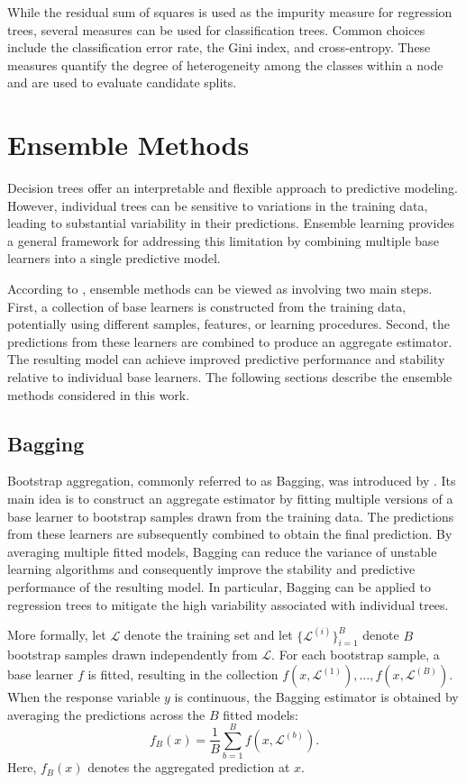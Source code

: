 While the residual sum of squares is used as the impurity measure for
regression trees, several measures can be used for classification trees.
Common choices include the classification error rate, the Gini index, and
cross-entropy. These measures quantify the degree of
heterogeneity among the classes within a node and are used to evaluate
candidate splits.

\section{Ensemble Methods}

Decision trees offer an interpretable and flexible approach to predictive
modeling. However, individual trees can be sensitive to variations in the
training data, leading to substantial variability in their predictions.
Ensemble learning provides a general framework for addressing this
limitation by combining multiple base learners into a single predictive
model.

According to , ensemble methods can be viewed
as involving two main steps. First, a collection of base learners is
constructed from the training data, potentially using different samples,
features, or learning procedures. Second, the predictions from these
learners are combined to produce an aggregate estimator. The resulting
model can achieve improved predictive performance and stability relative
to individual base learners. The following sections describe the ensemble methods
considered in this work.


\subsection{Bagging}

Bootstrap aggregation, commonly referred to as Bagging, was introduced by
. Its main idea is to construct an aggregate
estimator by fitting multiple versions of a base learner to bootstrap
samples drawn from the training data. The predictions from these learners
are subsequently combined to obtain the final prediction. By averaging
multiple fitted models, Bagging can reduce the variance of unstable
learning algorithms and consequently improve the stability and predictive
performance of the resulting model. In particular, Bagging can be applied
to regression trees to mitigate the high variability associated with
individual trees.

More formally, let $\mathcal{L}$ denote the training set and let
$\{\mathcal{L}^{\left(i\right)}\}^{B}_{i=1}$ denote $B$ bootstrap samples
drawn independently from $\mathcal{L}$. For each bootstrap sample, a base
learner $f$ is fitted, resulting in the collection $f\left(x,\mathcal{L}^{(1)}\right),\ldots, f\left(x,\mathcal{L}^{(B)}\right)$.
When the response variable $y$ is continuous, the Bagging estimator is
obtained by averaging the predictions across the $B$ fitted models:
\begin{equation}
\label{eq:bagging_regression}
f_B(x)
=
\frac{1}{B}
\sum_{b=1}^{B}
f\left(x,\mathcal{L}^{(b)}\right).
\end{equation}
Here, $f_B(x)$ denotes the aggregated prediction at $x$.


